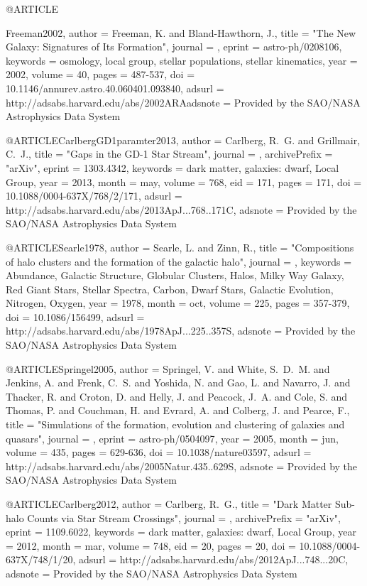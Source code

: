\documentclass[apj]{emulateapj}
\begin{document}
{{{{{{{{{{{{{{@ARTICLE{Freeman2002,
   author = {{Freeman}, K. and {Bland-Hawthorn}, J.},
    title = "{The New Galaxy: Signatures of Its Formation}",
  journal = {\araa},
   eprint = {astro-ph/0208106},
 keywords = {osmology, local group, stellar populations, stellar kinematics},
     year = 2002,
   volume = 40,
    pages = {487-537},
      doi = {10.1146/annurev.astro.40.060401.093840},
   adsurl = {http://adsabs.harvard.edu/abs/2002ARAadsnote = {Provided by the SAO/NASA Astrophysics Data System}
}



@ARTICLE{CarlbergGD1paramter2013,
   author = {{Carlberg}, R.~G. and {Grillmair}, C.~J.},
    title = "{Gaps in the GD-1 Star Stream}",
  journal = {\apj},
archivePrefix = "arXiv",
   eprint = {1303.4342},
 keywords = {dark matter, galaxies: dwarf, Local Group},
     year = 2013,
    month = may,
   volume = 768,
      eid = {171},
    pages = {171},
      doi = {10.1088/0004-637X/768/2/171},
   adsurl = {http://adsabs.harvard.edu/abs/2013ApJ...768..171C},
  adsnote = {Provided by the SAO/NASA Astrophysics Data System}
}


@ARTICLE{Searle1978,
   author = {{Searle}, L. and {Zinn}, R.},
    title = "{Compositions of halo clusters and the formation of the galactic halo}",
  journal = {\apj},
 keywords = {Abundance, Galactic Structure, Globular Clusters, Halos, Milky Way Galaxy, Red Giant Stars, Stellar Spectra, Carbon, Dwarf Stars, Galactic Evolution, Nitrogen, Oxygen},
     year = 1978,
    month = oct,
   volume = 225,
    pages = {357-379},
      doi = {10.1086/156499},
   adsurl = {http://adsabs.harvard.edu/abs/1978ApJ...225..357S},
  adsnote = {Provided by the SAO/NASA Astrophysics Data System}
}




@ARTICLE{Springel2005,
   author = {{Springel}, V. and {White}, S.~D.~M. and {Jenkins}, A. and {Frenk}, C.~S. and 
	{Yoshida}, N. and {Gao}, L. and {Navarro}, J. and {Thacker}, R. and 
	{Croton}, D. and {Helly}, J. and {Peacock}, J.~A. and {Cole}, S. and 
	{Thomas}, P. and {Couchman}, H. and {Evrard}, A. and {Colberg}, J. and 
	{Pearce}, F.},
    title = "{Simulations of the formation, evolution and clustering of galaxies and quasars}",
  journal = {\nat},
   eprint = {astro-ph/0504097},
     year = 2005,
    month = jun,
   volume = 435,
    pages = {629-636},
      doi = {10.1038/nature03597},
   adsurl = {http://adsabs.harvard.edu/abs/2005Natur.435..629S},
  adsnote = {Provided by the SAO/NASA Astrophysics Data System}
}


@ARTICLE{Carlberg2012,
   author = {{Carlberg}, R.~G.},
    title = "{Dark Matter Sub-halo Counts via Star Stream Crossings}",
  journal = {\apj},
archivePrefix = "arXiv",
   eprint = {1109.6022},
 keywords = {dark matter, galaxies: dwarf, Local Group},
     year = 2012,
    month = mar,
   volume = 748,
      eid = {20},
    pages = {20},
      doi = {10.1088/0004-637X/748/1/20},
   adsurl = {http://adsabs.harvard.edu/abs/2012ApJ...748...20C},
  adsnote = {Provided by the SAO/NASA Astrophysics Data System}
}



}}}}}}}}}}}}}}}
\end{document}
